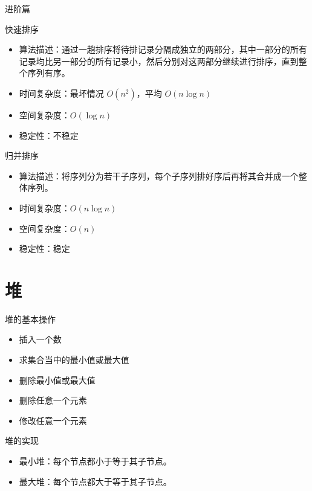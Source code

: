 \documentclass{beamer}
\begin{document}
\begin{frame}{进阶篇}
    \begin{block}{快速排序}
        \begin{itemize}
            \item 算法描述：通过一趟排序将待排记录分隔成独立的两部分，其中一部分的所有记录均比另一部分的所有记录小，然后分别对这两部分继续进行排序，直到整个序列有序。
            \item 时间复杂度：最坏情况 $O(n^2)$，平均 $O(n \log n)$
            \item 空间复杂度：$O(\log n)$
            \item 稳定性：不稳定
        \end{itemize}
    \end{block}

    \begin{block}{归并排序}
        \begin{itemize}
            \item 算法描述：将序列分为若干子序列，每个子序列排好序后再将其合并成一个整体序列。
            \item 时间复杂度：$O(n \log n)$
            \item 空间复杂度：$O(n)$
            \item 稳定性：稳定
        \end{itemize}
    \end{block}
\end{frame}

\section{堆}

\begin{frame}{堆的基本操作}
    \begin{itemize}
        \item 插入一个数
        \item 求集合当中的最小值或最大值
        \item 删除最小值或最大值
        \item 删除任意一个元素
        \item 修改任意一个元素
    \end{itemize}
\end{frame}

\begin{frame}{堆的实现}
    \begin{itemize}
        \item 最小堆：每个节点都小于等于其子节点。
        \item 最大堆：每个节点都大于等于其子节点。
    \end{itemize}
\end{frame}
\end{document}
